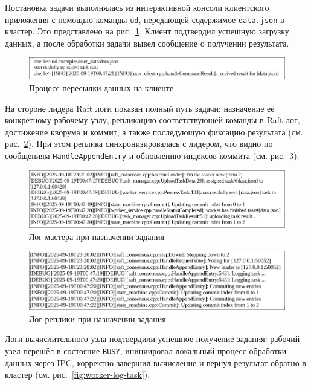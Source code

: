 Постановка задачи выполнялась из интерактивной консоли клиентского приложения с
помощью команды \texttt{ud}, передающей содержимое \texttt{data.json} в
кластер. Это представлено на рис.~\ref{fig:client-send}. Клиент подтвердил
успешную загрузку данных, а после обработки задачи вывел сообщение о получении
результата.

\begin{figure}[h!]
    \centering
    \includegraphics[width=0.8\linewidth]{inc/client-send.png}
    \caption{Процесс пересылки данных на клиенте}
    \label{fig:client-send}
\end{figure}

На стороне лидера Raft логи показан полный путь задачи: назначение её
конкретному рабочему узлу, репликацию соответствующей команды в Raft-лог, достижение
кворума и коммит, а также последующую фиксацию результата (см.
рис.~\ref{fig:master-log-task}). При этом реплика синхронизировалась с лидером,
что видно по сообщениям \texttt{HandleAppendEntry} и обновлению индексов
коммита (см. рис.~\ref{fig:replica-log-task}).

\begin{figure}[h!]
    \centering
    \includegraphics[width=0.8\linewidth]{inc/master-log-task.png}
    \caption{Лог мастера при назначении задания}
    \label{fig:master-log-task}
\end{figure}

\begin{figure}[h!]
    \centering
    \includegraphics[width=0.8\linewidth]{inc/replica-log-task.png}
    \caption{Лог реплики при назначении задания}
    \label{fig:replica-log-task}
\end{figure}

Логи вычислительного узла подтвердили успешное получение задания: рабочий узел перешёл
в состояние \texttt{BUSY}, инициировал локальный процесс обработки данных
через IPC, корректно завершил вычисление и вернул результат обратно в кластер
(см. рис.~\ref{fig:worker-log-task}).

